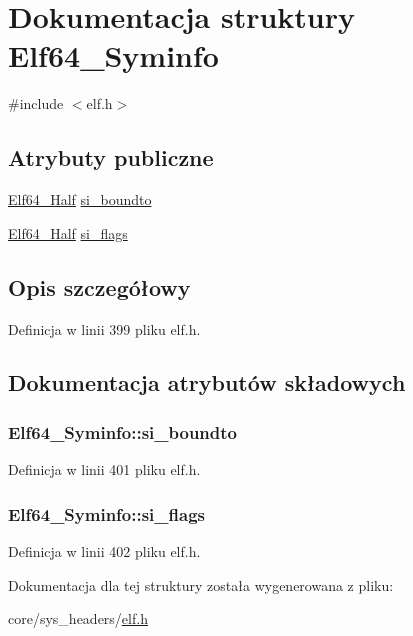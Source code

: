\hypertarget{struct_elf64___syminfo}{\section{Dokumentacja struktury Elf64\-\_\-\-Syminfo}
\label{struct_elf64___syminfo}
}


{\ttfamily \#include $<$elf.\-h$>$}

\subsection*{Atrybuty publiczne}
\begin{DoxyCompactItemize}
\item 
\hyperlink{elf_8h_adb6a5584018b431da3472e7c6a7fd731}{Elf64\-\_\-\-Half} \hyperlink{struct_elf64___syminfo_a919d1c0dd96fae4b828902b765097e15}{si\-\_\-boundto}
\item 
\hyperlink{elf_8h_adb6a5584018b431da3472e7c6a7fd731}{Elf64\-\_\-\-Half} \hyperlink{struct_elf64___syminfo_a919ad3ae58e391cb2cf9da819d9d1344}{si\-\_\-flags}
\end{DoxyCompactItemize}


\subsection{Opis szczegółowy}


Definicja w linii 399 pliku elf.\-h.



\subsection{Dokumentacja atrybutów składowych}
\hypertarget{struct_elf64___syminfo_a919d1c0dd96fae4b828902b765097e15}{
\subsubsection[{si\-\_\-boundto}]{ Elf64\-\_\-\-Syminfo\-::si\-\_\-boundto}}\label{struct_elf64___syminfo_a919d1c0dd96fae4b828902b765097e15}


Definicja w linii 401 pliku elf.\-h.

\hypertarget{struct_elf64___syminfo_a919ad3ae58e391cb2cf9da819d9d1344}{
\subsubsection[{si\-\_\-flags}]{ Elf64\-\_\-\-Syminfo\-::si\-\_\-flags}}\label{struct_elf64___syminfo_a919ad3ae58e391cb2cf9da819d9d1344}


Definicja w linii 402 pliku elf.\-h.



Dokumentacja dla tej struktury została wygenerowana z pliku\-:\begin{DoxyCompactItemize}
\item 
core/sys\-\_\-headers/\hyperlink{elf_8h}{elf.\-h}\end{DoxyCompactItemize}
